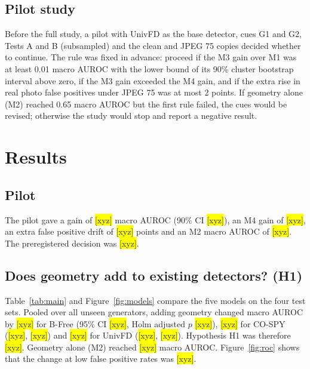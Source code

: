 \documentclass[11pt,a4paper]{article}
\newcommand{\xyz}[1][]{\colorbox{yellow}{[xyz]}}
\begin{document}
\subsection{Pilot study}
\label{sec:pilot}

Before the full study, a pilot with UnivFD as the base detector, cues G1 and G2, Tests A and B (subsampled) and the clean and JPEG 75 copies decided whether to continue. The rule was fixed in advance: proceed if the M3 gain over M1 was at least 0.01 macro AUROC with the lower bound of its 90\% cluster bootstrap interval above zero, if the M3 gain exceeded the M4 gain, and if the extra rise in real photo false positives under JPEG 75 was at most 2 points. If geometry alone (M2) reached 0.65 macro AUROC but the first rule failed, the cues would be revised; otherwise the study would stop and report a negative result.

\section{Results}
\label{sec:results}

\subsection{Pilot}

The pilot gave a gain of \xyz[pilot.delta]{} macro AUROC (90\% CI \xyz[pilot.ci90]), an M4 gain of \xyz[pilot.gain_m4]{}, an extra false positive drift of \xyz[pilot.extra_fpr_drift]{} points and an M2 macro AUROC of \xyz[pilot.m2_auroc]{}. The preregistered decision was \xyz[pilot.decision].

\subsection{Does geometry add to existing detectors? (H1)}

Table~\ref{tab:main} and Figure~\ref{fig:models} compare the five models on the four test sets. Pooled over all unseen generators, adding geometry changed macro AUROC by \xyz[h1.bfree.delta]{} for B-Free (95\% CI \xyz[h1.bfree.ci], Holm adjusted $p$ \xyz[h1.bfree.p]), \xyz[h1.cospy.delta]{} for CO-SPY (\xyz[h1.cospy.ci], \xyz[h1.cospy.p]) and \xyz[h1.univfd.delta]{} for UnivFD (\xyz[h1.univfd.ci], \xyz[h1.univfd.p]). Hypothesis H1 was therefore \xyz[h1.verdict]. Geometry alone (M2) reached \xyz[m2.macro_auroc]{} macro AUROC. Figure~\ref{fig:roc} shows that the change at low false positive rates was \xyz[h1.tpr_summary].
\end{document}
